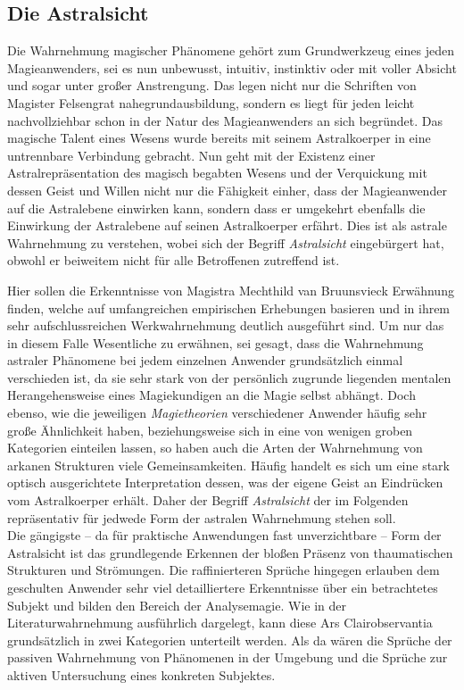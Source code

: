 \documentclass[a5paper,8pt]{book}
\begin{document}
\subsection{Die Astralsicht}
\begin{multicols}{2}
Die Wahrnehmung magischer Phänomene gehört zum Grundwerkzeug eines jeden Magieanwenders, sei es nun
unbewusst, intuitiv, instinktiv oder mit voller Absicht und sogar unter großer Anstrengung. Das legen nicht nur
die Schriften von Magister Felsengrat nahegrundausbildung, sondern es liegt für jeden leicht nachvollziehbar schon in der Natur
des Magieanwenders an sich begründet. Das magische Talent eines Wesens wurde bereits mit seinem Astralkoerper in eine
untrennbare Verbindung gebracht. Nun geht mit der Existenz einer Astralrepräsentation des magisch begabten Wesens
und der Verquickung mit dessen Geist und Willen nicht nur die Fähigkeit einher, dass der Magieanwender auf die Astralebene
einwirken kann, sondern dass er umgekehrt ebenfalls die Einwirkung der Astralebene auf seinen Astralkoerper erfährt. Dies
ist als astrale Wahrnehmung zu verstehen, wobei sich der Begriff \textit{Astralsicht} eingebürgert hat, obwohl er
beiweitem nicht für alle Betroffenen zutreffend ist.

Hier sollen die Erkenntnisse von Magistra Mechthild van Bruunsvieck Erwähnung finden, welche auf umfangreichen
empirischen Erhebungen basieren und in ihrem sehr aufschlussreichen Werkwahrnehmung deutlich
ausgeführt sind. Um nur das in diesem Falle Wesentliche zu erwähnen, sei gesagt, dass die Wahrnehmung
astraler Phänomene bei jedem einzelnen Anwender grundsätzlich einmal verschieden ist, da sie sehr stark von der
persönlich zugrunde liegenden mentalen Herangehensweise eines Magiekundigen an die Magie selbst abhängt. Doch ebenso,
wie die jeweiligen \textit{Magietheorien} verschiedener Anwender häufig sehr große Ähnlichkeit haben, beziehungsweise sich
in eine von wenigen groben Kategorien einteilen lassen, so haben auch die Arten der Wahrnehmung von arkanen
Strukturen viele Gemeinsamkeiten. Häufig handelt es sich um eine stark optisch \footnotemark[4]
ausgerichtete
Interpretation dessen, was der eigene Geist an Eindrücken vom Astralkoerper erhält. Daher der Begriff
\textit{Astralsicht} der im Folgenden repräsentativ für jedwede Form der astralen Wahrnehmung stehen soll.\\

Die gängigste -- da für praktische Anwendungen fast unverzichtbare -- Form der Astralsicht ist das grundlegende
Erkennen der bloßen Präsenz von thaumatischen Strukturen und Strömungen. Die raffinierteren Sprüche hingegen
erlauben dem geschulten Anwender sehr viel detailliertere Erkenntnisse über ein betrachtetes Subjekt und bilden den Bereich der
Analysemagie. Wie in der Literaturwahrnehmung ausführlich dargelegt, kann diese Ars
Clairobservantia grundsätzlich in zwei Kategorien unterteilt werden. Als da wären die Sprüche der passiven Wahrnehmung
von Phänomenen in der Umgebung und die Sprüche zur aktiven Untersuchung eines konkreten Subjektes.


\end{multicols}
\end{document}
